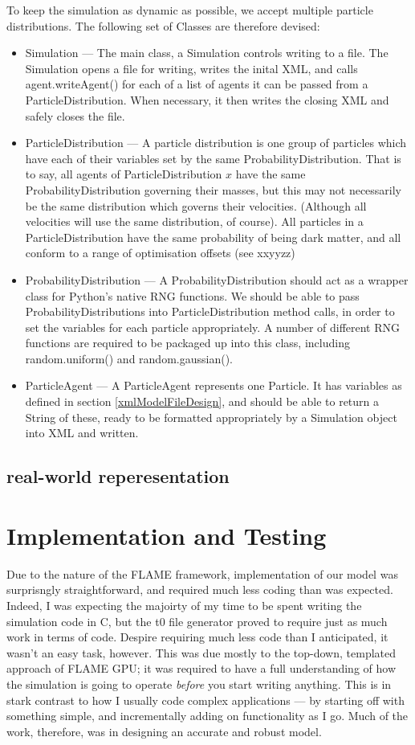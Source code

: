 \documentclass[11pt,a4paper]{article}
\begin{document}
To keep the simulation as dynamic as possible, we accept multiple particle distributions. The following set of Classes are therefore devised:
\begin{itemize}
\item Simulation --- The main class, a Simulation controls writing to a file. The Simulation opens a file for writing, writes the inital XML, and calls agent.writeAgent() for each of a list of agents it can be passed from a ParticleDistribution. When necessary, it then writes the closing XML and safely closes the file.
\item ParticleDistribution --- A particle distribution is one group of particles which have each of their variables set by the same ProbabilityDistribution. That is to say, all agents of ParticleDistribution $x$ have the same ProbabilityDistribution governing their masses, but this may not necessarily be the same distribution which governs their velocities. (Although all velocities will use the same distribution, of course). All particles in a ParticleDistribution have the same probability of being dark matter, and all conform to a range of optimisation offsets (see xxyyzz)
\item ProbabilityDistribution --- A ProbabilityDistribution should act as a wrapper class for Python's native RNG functions. We should be able to pass ProbabilityDistributions into ParticleDistribution method calls, in order to set the variables for each particle appropriately. A number of different RNG functions are required to be packaged up into this class, including random.uniform() and random.gaussian().
\item ParticleAgent --- A ParticleAgent represents one Particle. It has variables as defined in section \ref{xmlModelFileDesign}, and should be able to return a String of these, ready to be formatted appropriately by a Simulation object into XML and written.
\end{itemize}


\subsection{real-world reperesentation}

\section{Implementation and Testing}
Due to the nature of the FLAME framework, implementation of our model was surprisngly straightforward, and required much less coding than was expected. Indeed, I was expecting the majoirty of my time to be spent writing the simulation code in C, but the t0 file generator proved to require just as much work in terms of code. Despire requiring much less code than I anticipated, it wasn't an easy task, however. This was due mostly to the top-down, templated approach of FLAME GPU; it was required to have a full understanding of how the simulation is going to operate \emph{before} you start writing anything. This is in stark contrast to how I usually code complex applications --- by starting off with something simple, and incrementally adding on functionality as I go. Much of the work, therefore, was in designing an accurate and robust model.
\end{document}
